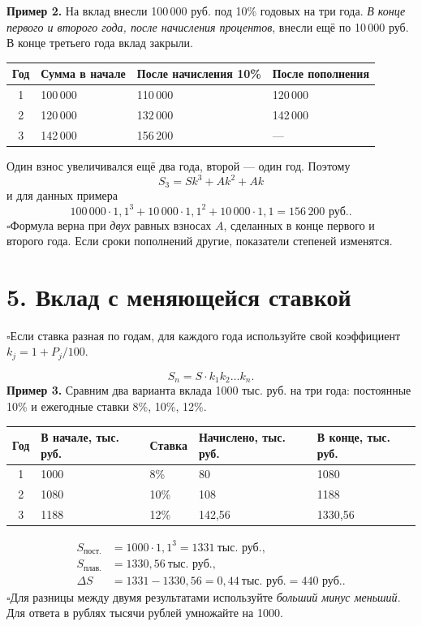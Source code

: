 \documentclass[a4paper,12pt]{article}
\newcommand{\checkitem}[1]{\noindent\(\square\)\enspace #1\par}
\newcommand{\smallrule}{\par\smallskip\noindent{\color{lightline}\rule{\linewidth}{.4pt}}\par\smallskip}
\newcommand{\rub}{\text{ руб.}}
\begin{document}
\textbf{Пример 2.} На вклад внесли 100\,000 руб. под 10\% годовых на три года. \emph{В конце первого и второго года, после начисления процентов}, внесли ещё по 10\,000 руб. В конце третьего года вклад закрыли.
\begin{center}
\renewcommand{\arraystretch}{1.27}
\begin{tabularx}{\linewidth}{@{}cXXX@{}}
\toprule
\textbf{Год} & \textbf{Сумма в начале} & \textbf{После начисления 10\%} & \textbf{После пополнения}\\
\midrule
1 & 100\,000 & 110\,000 & 120\,000\\
2 & 120\,000 & 132\,000 & 142\,000\\
3 & 142\,000 & 156\,200 & ---\\
\bottomrule
\end{tabularx}
\end{center}
Один взнос увеличивался ещё два года, второй --- один год. Поэтому
\[
\boxed{S_3=Sk^3+Ak^2+Ak}
\]
и для данных примера
\[
100\,000\cdot1{,}1^3+10\,000\cdot1{,}1^2+
10\,000\cdot1{,}1=\boxed{156\,200\rub}.
\]
\checkitem{Формула верна при \emph{двух} равных взносах \(A\), сделанных в конце первого и второго года. Если сроки пополнений другие, показатели степеней изменятся.}
\smallrule
\section*{5. Вклад с меняющейся ставкой}
\checkitem{Если ставка разная по годам, для каждого года используйте свой коэффициент \(k_j=1+P_j/100\).}
\[
\boxed{S_n=S\cdot k_1k_2\ldots k_n.}
\]
\textbf{Пример 3.} Сравним два варианта вклада 1000 тыс. руб. на три года:
постоянные 10\% и ежегодные ставки 8\%, 10\%, 12\%.
\begin{center}
\renewcommand{\arraystretch}{1.24}
\begin{tabularx}{\linewidth}{@{}cXXXX@{}}
\toprule
\textbf{Год} & \textbf{В начале, тыс. руб.} & \textbf{Ставка} & \textbf{Начислено, тыс. руб.} & \textbf{В конце, тыс. руб.}\\
\midrule
1 & 1000 & 8\% & 80 & 1080\\
2 & 1080 & 10\% & 108 & 1188\\
3 & 1188 & 12\% & 142{,}56 & 1330{,}56\\
\bottomrule
\end{tabularx}
\end{center}
\[
\begin{aligned}
S_{\text{пост.}}&=1000\cdot1{,}1^3=1331\ \text{тыс. руб.},\\
S_{\text{плав.}}&=1330{,}56\ \text{тыс. руб.},\\
\Delta S&=1331-1330{,}56=0{,}44\ \text{тыс. руб.}
=\boxed{440\rub}.
\end{aligned}
\]
\checkitem{Для разницы между двумя результатами используйте \emph{больший минус меньший}. Для ответа в рублях тысячи рублей умножайте на 1000.}
\end{document}
